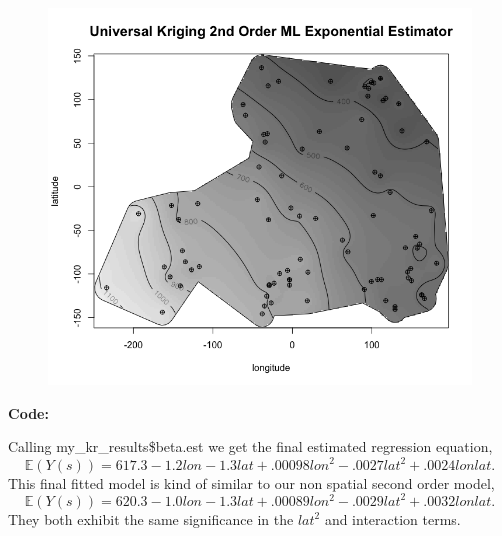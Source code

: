 \documentclass[12pt]{article}
\makeatletter
\theoremstyle{homework}
\newenvironment{exercise}[1]
{\def\@currentlabel{#1}\exercisecore}
{\endexercisecore}
\makeatother
\begin{document}
\begin{exercise}{2}
\begin{figure}[H]
  \begin{center}
  \includegraphics[width = \textwidth]{Rplot08.png}
  \end{center}
\end{figure}
\textbf{Code:}
\begin{center}

\end{center}
Calling my\_kr\_results\$beta.est we get the final estimated regression equation, 
\begin{equation*}
  \mathbb{E}(Y(s)) =  617.3-1.2lon -1.3lat + .00098lon^2 -.0027lat^2+ .0024lonlat.
\end{equation*}
This final fitted model is kind of similar to our non spatial second order model, 
\begin{equation*}
  \mathbb{E}(Y(s)) =  620.3-1.0lon -1.3lat + .00089lon^2 -.0029lat^2+ .0032lonlat.
\end{equation*}
They both exhibit the same significance in the $lat^2$ and interaction terms. 
\end{exercise}
\vspace{1in}
\end{document}
